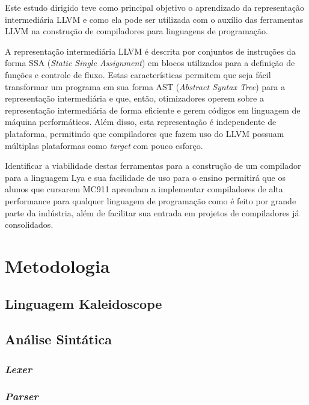 \documentclass[11pt, oneside, titlepage]{report}
\begin{document}
      Este estudo dirigido teve como principal objetivo o aprendizado da representação intermediária LLVM e como ela
      pode ser utilizada com o auxílio das ferramentas LLVM na construção de compiladores para linguagens de
      programação.

      A representação intermediária LLVM é descrita por conjuntos de instruções da forma
      SSA (\textit{Static Single Assignment}) em blocos utilizados para a definição de funções e controle de fluxo.
      Estas características permitem que seja fácil transformar um programa em sua forma
      AST (\textit{Abstract Syntax Tree}) para a representação intermediária e que, então, otimizadores operem sobre a
      representação intermediária de forma eficiente e gerem códigos em linguagem de máquina performáticos.
      Além disso, esta representação é independente de plataforma, permitindo que compiladores que fazem uso do LLVM
      possuam múltiplas plataformas como \textit{target} com pouco esforço.

      Identificar a viabilidade destas ferramentas para a construção de um compilador para a linguagem Lya e sua
      facilidade de uso para o ensino permitirá que os alunos que cursarem MC911 aprendam a implementar compiladores
      de alta performance para qualquer linguagem de programação como é feito por grande parte da indústria, além de
      facilitar sua entrada em projetos de compiladores já consolidados.

    \chapter{Metodologia}



      \section{Linguagem Kaleidoscope}

      \section{Análise Sintática}

        \subsection{\textit{Lexer}}

        \subsection{\textit{Parser}}
\end{document}
